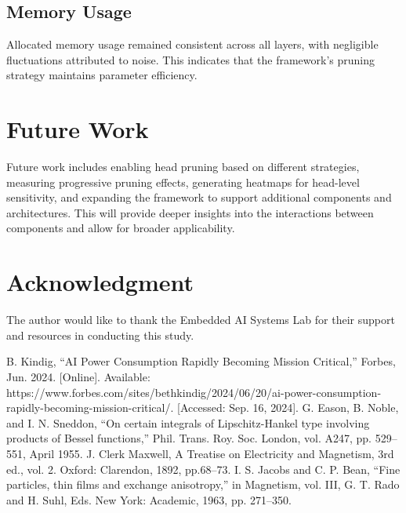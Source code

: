 \documentclass[conference]{IEEEtran}
\begin{document}
    \subsection{Memory Usage}
    Allocated memory usage remained consistent across all layers, with negligible fluctuations attributed to noise. This indicates that the framework's pruning strategy maintains parameter efficiency.

    \section{Future Work}
    Future work includes enabling head pruning based on different strategies, measuring progressive pruning effects, generating heatmaps for head-level sensitivity, and expanding the framework to support additional components and architectures. This will provide deeper insights into the interactions between components and allow for broader applicability.

    \section*{Acknowledgment}
    The author would like to thank the Embedded AI Systems Lab for their support and resources in conducting this study.

    \begin{thebibliography}{00}

         B. Kindig, ``AI Power Consumption Rapidly Becoming Mission Critical,'' Forbes, Jun. 2024. [Online]. Available: https://www.forbes.com/sites/bethkindig/2024/06/20/ai-power-consumption-rapidly-becoming-mission-critical/. [Accessed: Sep. 16, 2024].
         G. Eason, B. Noble, and I. N. Sneddon, ``On certain integrals of Lipschitz-Hankel type involving products of Bessel functions,'' Phil. Trans. Roy. Soc. London, vol. A247, pp. 529--551, April 1955.
         J. Clerk Maxwell, A Treatise on Electricity and Magnetism, 3rd ed., vol. 2. Oxford: Clarendon, 1892, pp.68--73.
         I. S. Jacobs and C. P. Bean, ``Fine particles, thin films and exchange anisotropy,'' in Magnetism, vol. III, G. T. Rado and H. Suhl, Eds. New York: Academic, 1963, pp. 271--350.
    \end{thebibliography}
\end{document}
